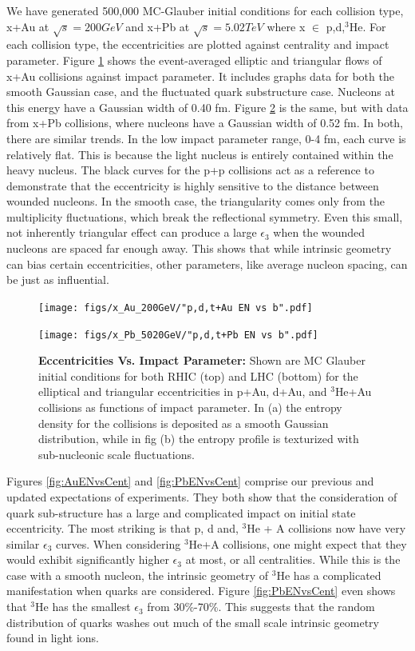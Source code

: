 \documentclass[preprint,showpacs,amsfonts,aps,prl,nofootinbib,floatfix]{revtex4}
\begin{document}
We have generated 500,000 MC-Glauber initial conditions for each collision type, x+Au at $\sqrt{s} = 200GeV$ and x+Pb at $\sqrt{s} = 5.02TeV$ where x $\in$ {p,d,$^3$He}. For each collision type, the eccentricities are plotted against centrality and impact parameter. Figure \ref{fig:AuENvsB} shows the event-averaged elliptic and triangular flows of x+Au collisions against impact parameter. It includes graphs data for both the smooth Gaussian case, and the fluctuated quark substructure case. Nucleons at this energy have a Gaussian width of 0.40 fm. Figure \ref{fig:PbENvsB} is the same, but with data from x+Pb collisions, where nucleons have a Gaussian width of 0.52 fm. In both, there are similar trends. In the low impact parameter range, 0-4 fm, each curve is relatively flat. This is because the light nucleus is entirely contained within the heavy nucleus. The black curves for the p+p collisions act as a reference to demonstrate that the eccentricity is highly sensitive to the distance between wounded nucleons. In the smooth case, the triangularity comes only from the multiplicity fluctuations, which break the reflectional symmetry. Even this small, not inherently triangular effect can produce a large $\epsilon_3$ when the wounded nucleons are spaced far enough away. This shows that while intrinsic geometry can bias certain eccentricities, other parameters, like average nucleon spacing, can be just as influential.
\begin{figure}[ht]
	\centering
	\texttt{[image: figs/x\_Au\_200GeV/"p,d,t+Au EN vs b".pdf]}
	\caption{}
	\label{fig:AuENvsB}
\end{figure}
\begin{figure}
	\centering
	\texttt{[image: figs/x\_Pb\_5020GeV/"p,d,t+Pb EN vs b".pdf]}
    \caption{\textbf{Eccentricities Vs. Impact Parameter:}  Shown are MC Glauber initial conditions for both RHIC (top) and LHC (bottom) for the elliptical and triangular eccentricities in p+Au, d+Au, and $^3$He+Au collisions as functions of impact parameter. In  (a) the entropy density for the collisions is deposited as a smooth Gaussian distribution, while in fig (b) the entropy profile is texturized with sub-nucleonic scale fluctuations. }
    \label{fig:PbENvsB}
\end{figure}
Figures \ref{fig:AuENvsCent} and \ref{fig:PbENvsCent} comprise our previous and updated expectations of experiments. They both show that the consideration of quark sub-structure has a large and complicated impact on initial state eccentricity. The most striking is that p, d and, $^3$He + A collisions now have very similar $\epsilon_3$ curves. When considering $^3$He+A collisions, one might expect that they would exhibit significantly higher $\epsilon_3$ at most, or all centralities. While this is the case with a smooth nucleon, the intrinsic geometry of $^3$He has a complicated manifestation when quarks are considered. Figure \ref{fig:PbENvsCent} even shows that $^3$He has the smallest $\epsilon_3$ from 30\%-70\%. This suggests that the random distribution of quarks washes out much of the small scale intrinsic geometry found in light ions. 
\end{document}
